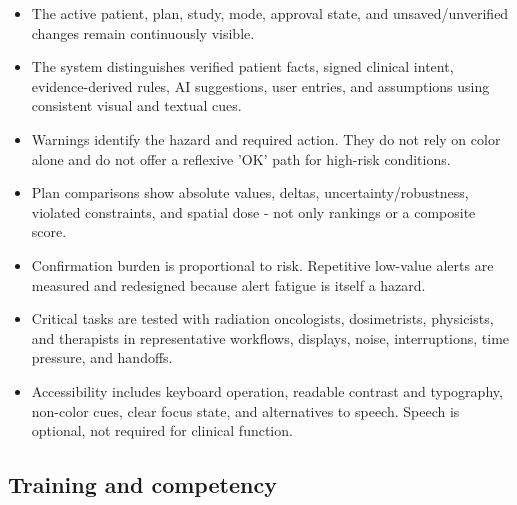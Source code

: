 \documentclass[11pt,letterpaper]{article}
\begin{document}
\begin{itemize}
\item The active patient, plan, study, mode, approval state, and unsaved\slash\allowbreak{}unverified changes remain continuously visible.
\item The system distinguishes verified patient facts, signed clinical intent, evidence-derived rules, AI suggestions, user entries, and assumptions using consistent visual and textual cues.
\item Warnings identify the hazard and required action. They do not rely on color alone and do not offer a reflexive 'OK' path for high-risk conditions.
\item Plan comparisons show absolute values, deltas, uncertainty\slash\allowbreak{}robustness, violated constraints, and spatial dose - not only rankings or a composite score.
\item Confirmation burden is proportional to risk. Repetitive low-value alerts are measured and redesigned because alert fatigue is itself a hazard.
\item Critical tasks are tested with radiation oncologists, dosimetrists, physicists, and therapists in representative workflows, displays, noise, interruptions, time pressure, and handoffs.
\item Accessibility includes keyboard operation, readable contrast and typography, non-color cues, clear focus state, and alternatives to speech. Speech is optional, not required for clinical function.
\end{itemize}

\subsection{Training and competency}
\end{document}

